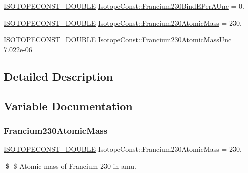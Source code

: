 \begin{DoxyCompactItemize}
\mbox{\hyperlink{group___isotope_const-_macros_ga8f45a7272ce02c0b4c65c44636ed719a}{I\+S\+O\+T\+O\+P\+E\+C\+O\+N\+S\+T\+\_\+\+D\+O\+U\+B\+LE}} \mbox{\hyperlink{group___isotope_const-_francium-_fr230_gac8cf2f640a56201bf323604303be85b7}{Isotope\+Const\+::\+Francium230\+Bind\+E\+Per\+A\+Unc}} = 0.
\item 
\mbox{\hyperlink{group___isotope_const-_macros_ga8f45a7272ce02c0b4c65c44636ed719a}{I\+S\+O\+T\+O\+P\+E\+C\+O\+N\+S\+T\+\_\+\+D\+O\+U\+B\+LE}} \mbox{\hyperlink{group___isotope_const-_francium-_fr230_ga415b95678d7bc614cb8de432afcbf81b}{Isotope\+Const\+::\+Francium230\+Atomic\+Mass}} = 230.
\item 
\mbox{\hyperlink{group___isotope_const-_macros_ga8f45a7272ce02c0b4c65c44636ed719a}{I\+S\+O\+T\+O\+P\+E\+C\+O\+N\+S\+T\+\_\+\+D\+O\+U\+B\+LE}} \mbox{\hyperlink{group___isotope_const-_francium-_fr230_gab1a8fc3a5c5d72dfc1dd40a714fa2d41}{Isotope\+Const\+::\+Francium230\+Atomic\+Mass\+Unc}} = 7.\+022e-\/06
\end{DoxyCompactItemize}


\subsection{Detailed Description}


\subsection{Variable Documentation}
\mbox{\label{group___isotope_const-_francium-_fr230_ga415b95678d7bc614cb8de432afcbf81b}} 
\subsubsection{\texorpdfstring{Francium230\+Atomic\+Mass}{Francium230AtomicMass}}
{\footnotesize\ttfamily \mbox{\hyperlink{group___isotope_const-_macros_ga8f45a7272ce02c0b4c65c44636ed719a}{I\+S\+O\+T\+O\+P\+E\+C\+O\+N\+S\+T\+\_\+\+D\+O\+U\+B\+LE}} Isotope\+Const\+::\+Francium230\+Atomic\+Mass = 230.}

\$ \$ Atomic mass of Francium-\/230 in amu. \mbox{\label{group___isotope_const-_francium-_fr230_gab1a8fc3a5c5d72dfc1dd40a714fa2d41}} 
